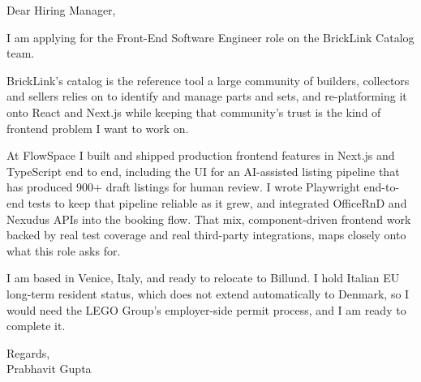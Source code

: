 \documentclass[a4paper,11pt]{article}
\begin{document}
Dear Hiring Manager,

I am applying for the Front-End Software Engineer role on the BrickLink Catalog team.

BrickLink's catalog is the reference tool a large community of builders, collectors and sellers relies on to identify and manage parts and sets, and re-platforming it onto React and Next.js while keeping that community's trust is the kind of frontend problem I want to work on.

At FlowSpace I built and shipped production frontend features in Next.js and TypeScript end to end, including the UI for an AI-assisted listing pipeline that has produced 900+ draft listings for human review. I wrote Playwright end-to-end tests to keep that pipeline reliable as it grew, and integrated OfficeRnD and Nexudus APIs into the booking flow. That mix, component-driven frontend work backed by real test coverage and real third-party integrations, maps closely onto what this role asks for.

I am based in Venice, Italy, and ready to relocate to Billund. I hold Italian EU long-term resident status, which does not extend automatically to Denmark, so I would need the LEGO Group's employer-side permit process, and I am ready to complete it.

Regards,\\
Prabhavit Gupta
\end{document}
